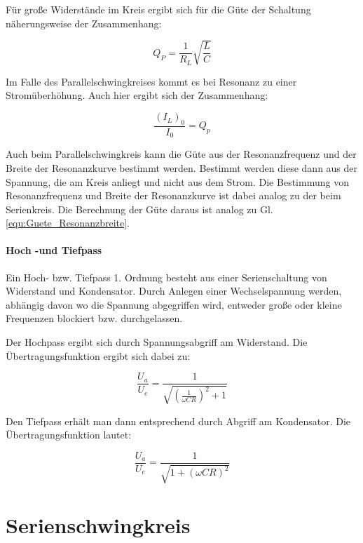 \documentclass[12pt,a4paper]{article}
\begin{document}
Für große Widerstände im Kreis ergibt sich für die Güte der Schaltung näherungsweise der Zusammenhang:

\begin{equation}
Q_P = \frac{1}{R_L} \sqrt{\frac{L}{C}}
\label{equ:Güte_Bauteile}
\end{equation}

Im Falle des Parallelschwingkreises kommt es bei Resonanz zu einer Stromüberhöhung. Auch hier ergibt sich der Zusammenhang:

\begin{equation}
\frac{(I_L)_0}{I_0} = Q_p
\label{eq:Parallel_Strmhoch}
\end{equation}

Auch beim Parallelschwingkreis kann die Güte aus der Resonanzfrequenz und der Breite der Resonanzkurve bestimmt werden. Bestimmt werden diese dann aus der Spannung, die am Kreis anliegt und nicht aus dem Strom. Die Bestimmung von Resonanzfrequenz und Breite der Resonanzkurve ist dabei analog zu der beim Serienkreis. Die Berechnung der Güte daraus ist analog zu Gl. \ref{equ:Guete_Resonanzbreite}.


\paragraph{Hoch -und Tiefpass}
Ein Hoch- bzw. Tiefpass 1. Ordnung besteht aus einer Serienschaltung von Widerstand und Kondensator. Durch Anlegen einer Wechselspannung werden, abhängig davon wo die Spannung abgegriffen wird, entweder große oder kleine Frequenzen blockiert bzw. durchgelassen.

Der Hochpass ergibt sich durch Spannungsabgriff am Widerstand. Die Übertragungsfunktion ergibt sich dabei zu:

\begin{equation}
\frac{U_a}{U_e} = \frac{1}{\sqrt{\left(\frac{1}{\omega C R}\right)^2+1}}
\end{equation}

Den Tiefpass erhält man dann entsprechend durch Abgriff am Kondensator. Die Übertragungsfunktion lautet:

\begin{equation}
\frac{U_a}{U_e} = \frac{1}{\sqrt{1+(\omega C R)^2}}
\end{equation}

\section{Serienschwingkreis}
\end{document}
